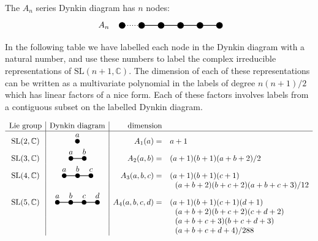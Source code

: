 \documentclass[11pt,oneside]{article}
\newcommand{\Complex}{\mathbb{C}}
\newcommand{\SL}{\mathrm{SL}}
\begin{document}
%



The $A_n$ series Dynkin diagram has $n$ nodes:
$$ \DynkinAn $$
In the following table we have labelled
each node in the Dynkin diagram with a natural number,
and use these numbers to label the complex irreducible
representations of $\SL(n+1,\Complex)$.
The dimension of each of these representations
can be written as a multivariate polynomial in the labels of degree 
$n(n+1)/2$ which has linear factors of a nice form.
Each of these factors involves labels from a contiguous subset on
the labelled Dynkin diagram.

$$
\begin{array}{c|c|rl}
\text{Lie group} & \text{Dynkin diagram} & \text{dimension} & \\
\hline
\SL(2,\Complex)           & \DynkinAa   & A_1(a) =& a+1 \\
\SL(3,\Complex)           & \DynkinAab  & A_2(a,b) =& (a+1)(b+1)(a+b+2)/2 \\
\SL(4,\Complex)           & \DynkinAabc   & A_3(a,b,c) =& (a+1)(b+1)(c+1) \\
 & & &\ \ (a+b+2)(b+c+2)(a+b+c+3)/12 \\
\SL(5,\Complex)           & \DynkinAabcd  & A_4(a,b,c,d) =& (a+1)(b+1)(c+1)(d+1) \\
 & & &\ \ (a+b+2)(b+c+2)(c+d+2) \\
 & & &\ \ (a+b+c+3)(b+c+d+3) \\
    & & & \ \ (a+b+c+d+4)/288 \\
\end{array}
$$
\end{document}
